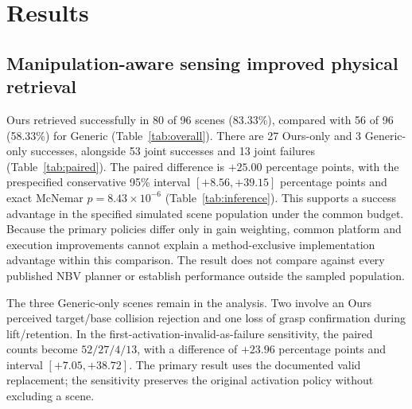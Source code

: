 \section{Results}
\label{sec:results}
\subsection{Manipulation-aware sensing improved physical retrieval}
Ours retrieved successfully in 80 of 96 scenes (83.33\%), compared with 56 of
96 (58.33\%) for Generic (Table~\ref{tab:overall}). There are 27 Ours-only and
3 Generic-only successes, alongside 53 joint successes and 13 joint failures
(Table~\ref{tab:paired}). The paired difference is $+25.00$ percentage points,
with the prespecified conservative 95\% interval $[+8.56,+39.15]$ percentage
points and exact McNemar $p=8.43\times10^{-6}$ (Table~\ref{tab:inference}).
This supports a success advantage in the specified simulated scene population
under the common budget. Because the primary policies differ only in gain
weighting, common platform and execution improvements cannot explain a
method-exclusive implementation advantage within this comparison. The result
does not compare against every published NBV planner or establish performance
outside the sampled population.

\begin{table}[tb]
\centering
\caption{Primary physical retrieval success under the shared observation budget.
The table is directly included from the existing evaluation asset.}
\label{tab:overall}

\end{table}
\begin{table}[tb]
\centering
\caption{Paired outcomes across all 96 independent scenes.}
\label{tab:paired}

\end{table}
\begin{table}[tb]
\centering
\caption{Prespecified paired inference. CI bounds refer to the Ours-minus-Generic
risk difference, in percentage points (pp), not to the $p$-value.}
\label{tab:inference}
\resizebox{\linewidth}{!}{}
\end{table}

The three Generic-only scenes remain in the analysis. Two involve an Ours
perceived target/base collision rejection and one loss of grasp confirmation
during lift/retention. In the first-activation-invalid-as-failure sensitivity,
the paired counts become $52/27/4/13$, with a difference of $+23.96$ percentage
points and interval $[+7.05,+38.72]$. The primary result uses the documented valid
replacement; the sensitivity preserves the original activation policy without
excluding a scene.

